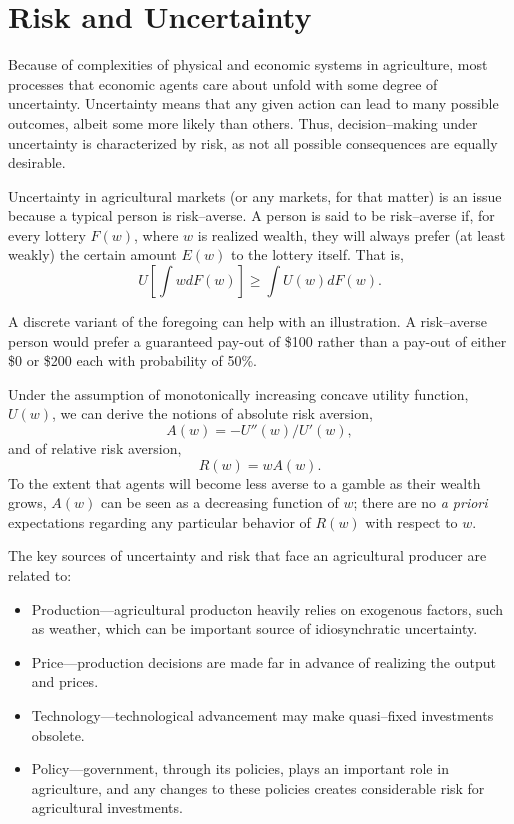 \documentclass[
]{book}
\providecommand{\tightlist}{%
  \setlength{\itemsep}{0pt}\setlength{\parskip}{0pt}}
\begin{document}
\hypertarget{risk-and-uncertainty}{%
\chapter{Risk and Uncertainty}\label{risk-and-uncertainty}}

Because of complexities of physical and economic systems in agriculture, most processes that economic agents care about unfold with some degree of uncertainty. Uncertainty means that any given action can lead to many possible outcomes, albeit some more likely than others. Thus, decision--making under uncertainty is characterized by risk, as not all possible consequences are equally desirable.

Uncertainty in agricultural markets (or any markets, for that matter) is an issue because a typical person is risk--averse. A person is said to be risk--averse if, for every lottery \(F(w)\), where \(w\) is realized wealth, they will always prefer (at least weakly) the certain amount \(E(w)\) to the lottery itself. That is, \[U\left[\int w dF(w)\right] \ge \int U(w)dF(w).\]

A discrete variant of the foregoing can help with an illustration. A risk--averse person would prefer a guaranteed pay-out of \$100 rather than a pay-out of either \$0 or \$200 each with probability of 50\%.

Under the assumption of monotonically increasing concave utility function, \(U(w)\), we can derive the notions of absolute risk aversion, \[A(w) = -U''(w)/U'(w),\] and of relative risk aversion, \[R(w) = wA(w).\] To the extent that agents will become less averse to a gamble as their wealth grows, \(A(w)\) can be seen as a decreasing function of \(w\); there are no \emph{a priori} expectations regarding any particular behavior of \(R(w)\) with respect to \(w\).

The key sources of uncertainty and risk that face an agricultural producer are related to:

\begin{itemize}
\tightlist
\item
  Production---agricultural producton heavily relies on exogenous factors, such as weather, which can be important source of idiosynchratic uncertainty.
\item
  Price---production decisions are made far in advance of realizing the output and prices.
\item
  Technology---technological advancement may make quasi--fixed investments obsolete.
\item
  Policy---government, through its policies, plays an important role in agriculture, and any changes to these policies creates considerable risk for agricultural investments.
\end{itemize}
\end{document}
